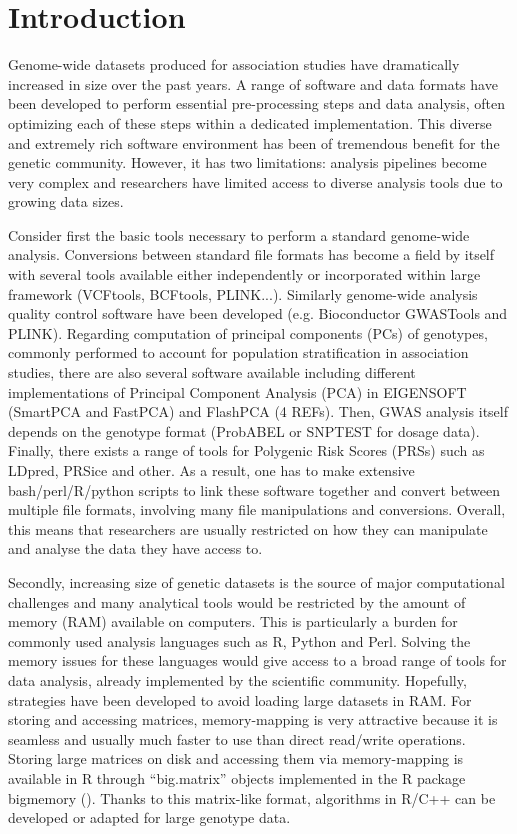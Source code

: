 \documentclass{bioinfo}
\begin{document}
\maketitle

\section{Introduction}

Genome-wide datasets produced for association studies have dramatically increased in size over the past years. A range of software and data formats have been developed to perform essential pre-processing steps and data analysis, often optimizing each of these steps within a dedicated implementation. This diverse and extremely rich software environment has been of tremendous benefit for the genetic community. However, it has two limitations: analysis pipelines become very complex and researchers have limited access to diverse analysis tools due to growing data sizes.

Consider first the basic tools necessary to perform a standard genome-wide analysis. Conversions between standard file formats has become a field by itself with several tools available either independently or incorporated within large framework (VCFtools, BCFtools, PLINK...). Similarly genome-wide analysis quality control software have been developed (e.g. Bioconductor GWASTools and PLINK). Regarding computation of principal components (PCs) of genotypes, commonly performed to account for population stratification in association studies, there are also several software available including different implementations of Principal Component Analysis (PCA) in EIGENSOFT (SmartPCA and FastPCA) and FlashPCA (4 REFs). Then, GWAS analysis itself depends on the genotype format (ProbABEL or SNPTEST for dosage data).  Finally, there exists a range of tools for Polygenic Risk Scores (PRSs) such as LDpred, PRSice and other. As a result, one has to make extensive bash/perl/R/python scripts to link these software together and convert between multiple file formats, involving many file manipulations and conversions. Overall, this means that researchers are usually restricted on how they can manipulate and analyse the data they have access to. 

Secondly, increasing size of genetic datasets is the source of major computational challenges and many analytical tools would be restricted by the amount of memory (RAM) available on computers. This is particularly a burden for commonly used analysis languages such as R, Python and Perl. Solving the memory issues for these languages would give access to a broad range of tools for data analysis, already implemented by the scientific community. Hopefully, strategies have been developed to avoid loading large datasets in RAM. For storing and accessing matrices, memory-mapping is very attractive because it is seamless and usually much faster to use than direct read/write operations. Storing large matrices on disk and accessing them via memory-mapping is available in R through ``big.matrix'' objects implemented in the R package bigmemory (\cite{Kane2013}). Thanks to this matrix-like format, algorithms in R/C++ can be developed or adapted for large genotype data. 
\end{document}
